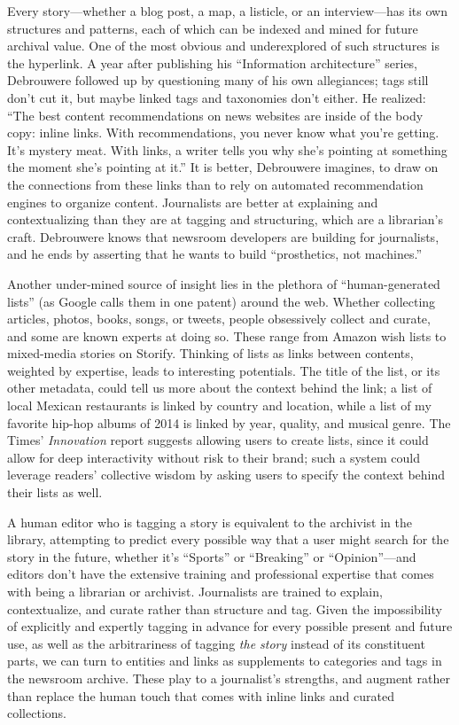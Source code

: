 Every story---whether a blog post, a map, a listicle, or an interview---has its own structures and patterns, each of which can be indexed and mined for future archival value. One of the most obvious and underexplored of such structures is the hyperlink. A year after publishing his ``Information architecture'' series, Debrouwere followed up by questioning many of his own allegiances; tags still don't cut it, but maybe linked tags and taxonomies don't either. He realized: ``The best content recommendations on news websites are inside of the body copy: inline links. With recommendations, you never know what you're getting. It's mystery meat. With links, a writer tells you why she's pointing at something the moment she's pointing at it.''\autocite{debrouwere_taxonomies_2011} It is better, Debrouwere imagines, to draw on the connections from these links than to rely on automated recommendation engines to organize content. Journalists are better at explaining and contextualizing than they are at tagging and structuring, which are a librarian's craft. Debrouwere knows that newsroom developers are building for journalists, and he ends by asserting that he wants to build ``prosthetics, not machines.''

Another under-mined source of insight lies in the plethora of ``human-generated lists'' (as Google calls them in one patent) around the web.\autocite{franks_discovering_2012} Whether collecting articles, photos, books, songs, or tweets, people obsessively collect and curate, and some are known experts at doing so. These range from Amazon wish lists to mixed-media stories on Storify. Thinking of lists as links between contents, weighted by expertise, leads to interesting potentials. The title of the list, or its other metadata, could tell us more about the context behind the link; a list of local Mexican restaurants is linked by country and location, while a list of my favorite hip-hop albums of 2014 is linked by year, quality, and musical genre. The Times' \emph{Innovation} report suggests allowing users to create lists, since it could allow for deep interactivity without risk to their brand; such a system could leverage readers' collective wisdom by asking users to specify the context behind their lists as well.

A human editor who is tagging a story is equivalent to the archivist in the library, attempting to predict every possible way that a user might search for the story in the future, whether it's ``Sports'' or ``Breaking'' or ``Opinion''---and editors don't have the extensive training and professional expertise that comes with being a librarian or archivist. Journalists are trained to explain, contextualize, and curate rather than structure and tag. Given the impossibility of explicitly and expertly tagging in advance for every possible present and future use, as well as the arbitrariness of tagging \emph{the story} instead of its constituent parts, we can turn to entities and links as supplements to categories and tags in the newsroom archive. These play to a journalist's strengths, and augment rather than replace the human touch that comes with inline links and curated collections.

